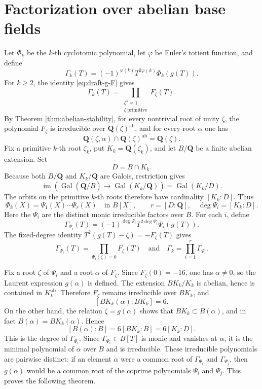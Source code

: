 \section{Factorization over abelian base fields}

Let $\Phi_k$ be the $k$-th cyclotomic polynomial, let $\varphi$ be
Euler's totient function, and define
\[
 \Gamma_k(T)=(-1)^{\varphi(k)}T^{2\varphi(k)}\Phi_k(g(T)).
\]
For $k\ge2$, the identity \eqref{eq:draft-g-F} gives
\begin{equation}\label{eq:Gamma-fiber-product}
 \Gamma_k(T)=
 \prod_{\substack{\zeta^k=1\\ \zeta\ \mathrm{primitive}}}F_\zeta(T).
\end{equation}
By Theorem \ref{thm:abelian-stability}, for every nontrivial root of
unity $\zeta$, the polynomial $F_\zeta$ is irreducible over
$\mathbf Q(\zeta)^{\mathrm{ab}}$, and for every root $\alpha$ one has
\[
 \mathbf Q(\zeta,\alpha)\cap
 \mathbf Q(\zeta)^{\mathrm{ab}}=\mathbf Q(\zeta).
\]
Fix a primitive $k$-th root $\zeta_k$, put
$K_k=\mathbf Q(\zeta_k)$, and let $B/\mathbf Q$ be a finite abelian
extension.  Set
\[
 D=B\cap K_k.
\]
Because both $B/\mathbf Q$ and $K_k/\mathbf Q$ are Galois, restriction
gives
\[
 \operatorname{im}\!\left(\operatorname{Gal}(\overline{\mathbf Q}/B)
 \longrightarrow\operatorname{Gal}(K_k/\mathbf Q)\right)
 =\operatorname{Gal}(K_k/D).
\]
The orbits on the primitive $k$-th roots therefore have cardinality
$[K_k:D]$.  Thus
\[
 \Phi_k(X)=\Psi_1(X)\cdots\Psi_r(X)\quad\text{in }B[X],
 \qquad
 r=[D:\mathbf Q],\quad \deg\Psi_i=[K_k:D].
\]
Here the $\Psi_i$ are the distinct monic irreducible factors over $B$.
For each $i$, define
\[
 \Gamma_{\Psi_i}(T)
 =(-1)^{\deg\Psi_i}T^{2\deg\Psi_i}\Psi_i(g(T)).
\]
The fixed-degree identity $T^2(g(T)-\zeta)=-F_\zeta(T)$ gives
\[
 \Gamma_{\Psi_i}(T)=\prod_{\Psi_i(\zeta)=0}F_\zeta(T)
 \quad\text{and}\quad
 \Gamma_k=\prod_{i=1}^r\Gamma_{\Psi_i}.
\]

Fix a root $\zeta$ of $\Psi_i$ and a root $\alpha$ of $F_\zeta$.
Since $F_\zeta(0)=-16$, one has $\alpha\ne0$, so the Laurent expression
$g(\alpha)$ is defined.
The extension $BK_k/K_k$ is abelian, hence is contained in
$K_k^{\mathrm{ab}}$.  Therefore $F_\zeta$ remains irreducible over
$BK_k$, and
\[
 [BK_k(\alpha):BK_k]=6.
\]
On the other hand, the relation $\zeta=g(\alpha)$ shows that
$BK_k\subset B(\alpha)$, and in fact $B(\alpha)=BK_k(\alpha)$.  Hence
\[
 [B(\alpha):B]
 =6[BK_k:B]
 =6[K_k:D].
\]
This is the degree of $\Gamma_{\Psi_i}$.  Since
$\Gamma_{\Psi_i}\in B[T]$ is monic and vanishes at $\alpha$, it is the
minimal polynomial of $\alpha$ over $B$ and is irreducible.  These
irreducible polynomials are pairwise distinct: if an element $\alpha$
were a common root of $\Gamma_{\Psi_i}$ and $\Gamma_{\Psi_j}$, then
$g(\alpha)$ would be a common root of the coprime polynomials
$\Psi_i$ and $\Psi_j$.  This proves the following theorem.

